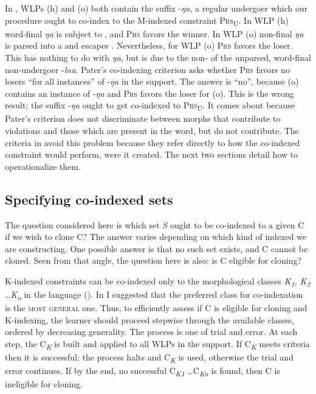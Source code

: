 \documentclass[output=paper,
modfonts
]{LSP/langsci}
\begin{document}
In , WLPs (h) and (o) both contain the suffix -\textit{ŋa}, a regular undergoer which our procedure ought to co-index to the M-indexed constraint \textsc{Prs}\textsc{\textsubscript{U}}. In WLP (h) word-final \textit{ŋa} is subject to , and \textsc{Prs} favors the winner. In WLP (o) non-final \textit{ŋa} is parsed into a  and escapes . Nevertheless, for WLP (o) \textsc{Prs} favors the loser. This has nothing to do with \textit{ŋa}, but is due to the non- of the unparsed, word-final non-undergoer -\textit{lna}. Pater's co-indexing criterion asks whether \textsc{Prs} favors no losers ``for all instances'' of -\textit{ŋa} in the support. The answer is ``no'', because (o) contains an instance of -\textit{ŋa} and \textsc{Prs} favors the loser for (o). This is the wrong result; the suffix -\textit{ŋa} ought to get co-indexed to \textsc{Prs}\textsc{\textsubscript{U}}. It comes about because Pater's criterion does not discriminate between morphs that contribute to violations and those which are present in the word, but do not contribute. The criteria in  avoid this problem because they refer directly to how the co-indexed constraint would perform, were it created. The next two sections detail how to operationalize them.

\subsection[Specifying co{}-indexed sets]{Specifying co-indexed sets}\label{sec:round:8.2}
\label{bkm:Ref335906264}\label{bkm:Ref335576418}
The question considered here is which set \textit{S} ought to be co-indexed to a given  C if we wish to clone C? The answer varies depending on which kind of indexed  we are constructing. One possible answer is that no such set exists, and C cannot be cloned. Seen from that angle, the question here is also: is C eligible for cloning?

K-indexed constraints can be co-indexed only to the morphological classes \textit{K}\textit{\textsubscript{1}}\textit{, K}\textit{\textsubscript{2}} \dots \textit{K}\textit{\textsubscript{n}} in the language (). In  I suggested that the preferred class for co-indexation is the \textsc{most} \textsc{general} one. Thus, to efficiently assess if  C is eligible for cloning and K-indexing, the learner should proceed stepwise through the available classes, ordered by decreasing generality. The process is one of trial and error. At each step, the  C\textit{\textsubscript{K}} is built and applied to all WLPs in the support. If C\textit{\textsubscript{K}} meets criteria  then it is successful; the process halts and C\textit{\textsubscript{K}} is used, otherwise the trial and error continues. If by the end, no successful  C\textit{\textsubscript{K1}} \dots C\textit{\textsubscript{Kn} }is found, then C is ineligible for cloning.
\end{document}
